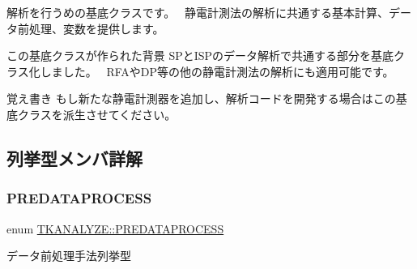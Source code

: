 解析を行うめの基底クラスです。~\newline
 静電計測法の解析に共通する基本計算、データ前処理、変数を提供します。~\newline
 \begin{DoxyParagraph}{この基底クラスが作られた背景}
S\+Pと\+I\+S\+Pのデータ解析で共通する部分を基底クラス化しました。~\newline
 R\+F\+Aや\+D\+P等の他の静電計測法の解析にも適用可能です。~\newline
 
\end{DoxyParagraph}
\begin{DoxyNote}{覚え書き}
もし新たな静電計測器を追加し、解析コードを開発する場合はこの基底クラスを派生させてください。 
\end{DoxyNote}


\subsection{列挙型メンバ詳解}
\mbox{\label{class_t_k_a_n_a_l_y_z_e_a7a931f59627879ac86be378797e00e1e}} 
\subsubsection{\texorpdfstring{P\+R\+E\+D\+A\+T\+A\+P\+R\+O\+C\+E\+SS}{PREDATAPROCESS}}
{\footnotesize\ttfamily enum \hyperlink{class_t_k_a_n_a_l_y_z_e_a7a931f59627879ac86be378797e00e1e}{T\+K\+A\+N\+A\+L\+Y\+Z\+E\+::\+P\+R\+E\+D\+A\+T\+A\+P\+R\+O\+C\+E\+SS}\hspace{0.3cm}{\ttfamily [strong]}}

データ前処理手法列挙型

